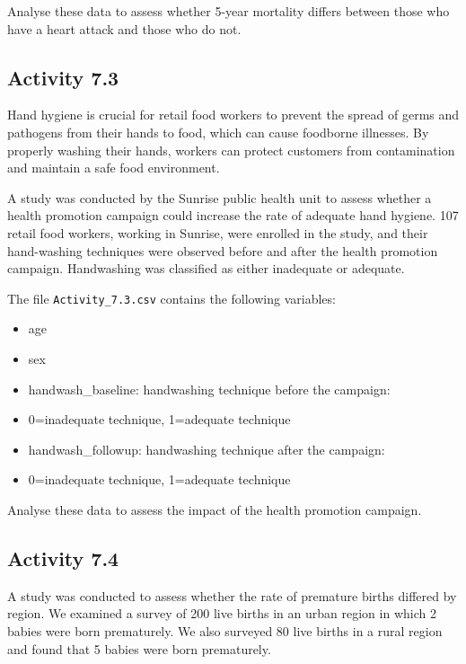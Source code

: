 \documentclass[
  a4paper,
]{memoir}
\providecommand{\tightlist}{%
  \setlength{\itemsep}{0pt}\setlength{\parskip}{0pt}}
\begin{document}
Analyse these data to assess whether 5-year mortality differs between
those who have a heart attack and those who do not.

\subsection*{Activity 7.3}\label{activity-7.3}

Hand hygiene is crucial for retail food workers to prevent the spread of
germs and pathogens from their hands to food, which can cause foodborne
illnesses. By properly washing their hands, workers can protect
customers from contamination and maintain a safe food environment.

A study was conducted by the Sunrise public health unit to assess
whether a health promotion campaign could increase the rate of adequate
hand hygiene. 107 retail food workers, working in Sunrise, were enrolled
in the study, and their hand-washing techniques were observed before and
after the health promotion campaign. Handwashing was classified as
either inadequate or adequate.

The file \texttt{Activity\_7.3.csv} contains the following variables:

\begin{itemize}
\tightlist
\item
  age
\item
  sex
\item
  handwash\_baseline: handwashing technique before the campaign:
\item
  0=inadequate technique, 1=adequate technique
\item
  handwash\_followup: handwashing technique after the campaign:
\item
  0=inadequate technique, 1=adequate technique
\end{itemize}

Analyse these data to assess the impact of the health promotion
campaign.

\subsection*{Activity 7.4}\label{activity-7.4}

A study was conducted to assess whether the rate of premature births
differed by region. We examined a survey of 200 live births in an urban
region in which 2 babies were born prematurely. We also surveyed 80 live
births in a rural region and found that 5 babies were born prematurely.
\end{document}
